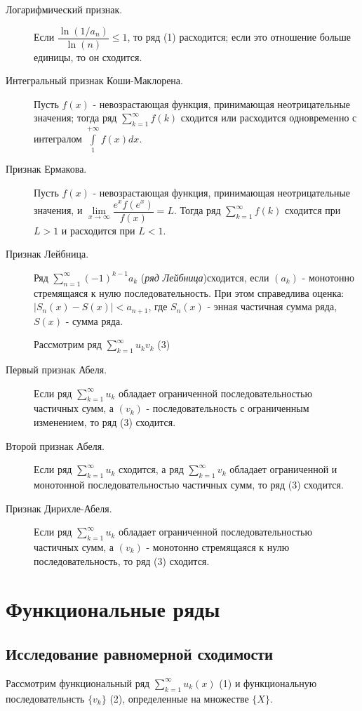 \documentclass[a4paper,12pt]{scrartcl}
\begin{document}
\begin{description}
\item[Логарифмический признак.] Если $\dfrac{\ln(1/a_n)}{\ln(n)} \leqslant 1$, то ряд (1) расходится; если это отношение больше единицы, то он сходится.
\item[Интегральный признак Коши-Маклорена.] Пусть $f(x)$ - невозрастающая функция, принимающая неотрицательные значения; тогда ряд $\sum\limits_{k=1}^{\infty}f(k)$ сходится или расходится одновременно с интегралом $\int\limits_{1}^{+\infty}f(x)dx$.
\item[Признак Ермакова.] Пусть $f(x)$ - невозрастающая функция, принимающая неотрицательные значения, и $\lim\limits_{x\to\infty}\dfrac{e^xf(e^x)}{f(x)} = L$. Тогда ряд $\sum\limits_{k=1}^{\infty}f(k)$ сходится при $L > 1$ и расходится при $L <1$.
\item[Признак Лейбница.] Ряд $\sum\limits_{n=1}^{\infty}(-1)^{k-1}a_k$ (\emph{ряд Лейбница})сходится, если $\left(a_k\right)$ - монотонно стремящаяся к нулю последовательность. При этом справедлива оценка: $| S_n(x) - S(x)| < a_{n+1}$, где $S_n(x)$ - энная частичная сумма ряда, $S(x)$ - сумма ряда.

Рассмотрим ряд $\sum\limits_{k=1}^{\infty}u_kv_k$  (3)
\item[Первый признак Абеля.] Если ряд $\sum\limits_{k=1}^{\infty}u_k$ обладает ограниченной последовательностью частичных сумм, а $(v_k)$ - последовательность с ограниченным изменением, то ряд (3) сходится.
\item[Второй признак Абеля.] Если ряд $\sum\limits_{k=1}^{\infty}u_k$ сходится, а ряд $\sum\limits_{k=1}^{\infty}v_k$ обладает ограниченной и монотонной последовательностью частичных сумм, то ряд (3) сходится.
\item[Признак Дирихле-Абеля.] Если ряд $\sum\limits_{k=1}^{\infty}u_k$ обладает ограниченной последовательностью частичных сумм, а $(v_k)$ - монотонно стремящаяся к нулю последовательность, то ряд (3) сходится.
\end{description}

\section{Функциональные ряды}
\subsection{Исследование равномерной сходимости}
Рассмотрим функциональный ряд $\sum\limits_{k=1}^{\infty}u_k(x)$ (1) и функциональную последовательнсть $\{v_k\}$ (2), определенные на множестве $\{X\}.$
\end{document}
